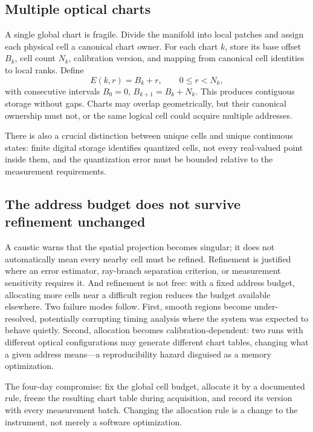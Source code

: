 \documentclass[11pt]{article}
\begin{document}
\subsection{Multiple optical charts}

A single global chart is fragile. Divide the manifold into local patches and assign each
physical cell a canonical chart owner. For each chart $k$, store its base offset $B_k$,
cell count $N_k$, calibration version, and mapping from canonical cell identities to
local ranks. Define
\begin{equation}
\boxed{E(k,r) = B_k + r, \qquad 0 \le r < N_k,}
\end{equation}
with consecutive intervals $B_0 = 0$, $B_{k+1} = B_k + N_k$. This produces contiguous
storage without gaps. Charts may overlap geometrically, but their canonical ownership
must not, or the same logical cell could acquire multiple addresses.

There is also a crucial distinction between unique cells and unique continuous states:
finite digital storage identifies quantized cells, not every real-valued point inside
them, and the quantization error must be bounded relative to the measurement
requirements.

\subsection{The address budget does not survive refinement unchanged}

A caustic warns that the spatial projection becomes singular; it does not automatically
mean every nearby cell must be refined. Refinement is justified where an error
estimator, ray-branch separation criterion, or measurement sensitivity requires it. And
refinement is not free: with a fixed address budget, allocating more cells near a
difficult region reduces the budget available elsewhere. Two failure modes follow.
First, smooth regions become under-resolved, potentially corrupting timing analysis
where the system was expected to behave quietly. Second, allocation becomes
calibration-dependent: two runs with different optical configurations may generate
different chart tables, changing what a given address means---a reproducibility hazard
disguised as a memory optimization.

The four-day compromise: fix the global cell budget, allocate it by a documented rule,
freeze the resulting chart table during acquisition, and record its version with every
measurement batch. Changing the allocation rule is a change to the instrument, not
merely a software optimization.
\end{document}
